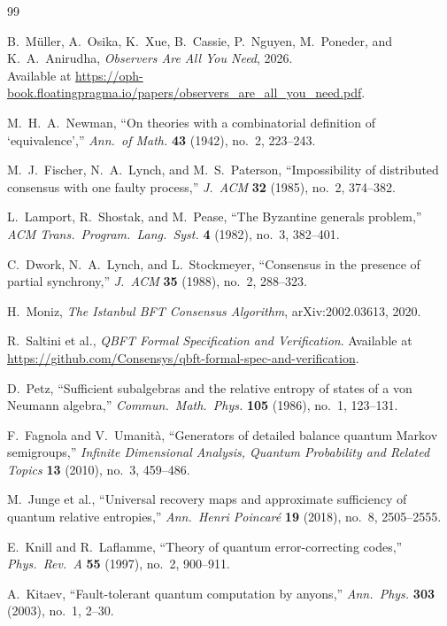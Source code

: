 \documentclass[11pt]{article}
\theoremstyle{remark}
\theoremstyle{plain}
\begin{document}
\begin{thebibliography}{99}

B.~M\"uller, A.~Osika, K.~Xue, B.~Cassie, P.~Nguyen, M.~Poneder, and K.~A.~Anirudha,
\emph{Observers Are All You Need},
2026.\\
Available at \url{https://oph-book.floatingpragma.io/papers/observers_are_all_you_need.pdf}.

M.~H.~A.~Newman,
``On theories with a combinatorial definition of `equivalence',''
\emph{Ann.\ of Math.} \textbf{43} (1942), no.~2, 223--243.

M.~J.~Fischer, N.~A.~Lynch, and M.~S.~Paterson,
``Impossibility of distributed consensus with one faulty process,''
\emph{J.\ ACM} \textbf{32} (1985), no.~2, 374--382.

L.~Lamport, R.~Shostak, and M.~Pease,
``The Byzantine generals problem,''
\emph{ACM Trans.\ Program.\ Lang.\ Syst.} \textbf{4} (1982), no.~3, 382--401.

C.~Dwork, N.~A.~Lynch, and L.~Stockmeyer,
``Consensus in the presence of partial synchrony,''
\emph{J.\ ACM} \textbf{35} (1988), no.~2, 288--323.

H.~Moniz,
\emph{The Istanbul BFT Consensus Algorithm},
arXiv:2002.03613, 2020.

R.~Saltini et al.,
\emph{QBFT Formal Specification and Verification}.
Available at \url{https://github.com/Consensys/qbft-formal-spec-and-verification}.

D.~Petz,
``Sufficient subalgebras and the relative entropy of states of a von Neumann algebra,''
\emph{Commun.\ Math.\ Phys.} \textbf{105} (1986), no.~1, 123--131.

F.~Fagnola and V.~Umanit\`a,
``Generators of detailed balance quantum Markov semigroups,''
\emph{Infinite Dimensional Analysis, Quantum Probability and Related Topics}
\textbf{13} (2010), no.~3, 459--486.

M.~Junge et al.,
``Universal recovery maps and approximate sufficiency of quantum relative entropies,''
\emph{Ann.\ Henri Poincar\'e} \textbf{19} (2018), no.~8, 2505--2555.

E.~Knill and R.~Laflamme,
``Theory of quantum error-correcting codes,''
\emph{Phys.\ Rev.\ A} \textbf{55} (1997), no.~2, 900--911.

A.~Kitaev,
``Fault-tolerant quantum computation by anyons,''
\emph{Ann.\ Phys.} \textbf{303} (2003), no.~1, 2--30.


\end{thebibliography}
\end{document}
